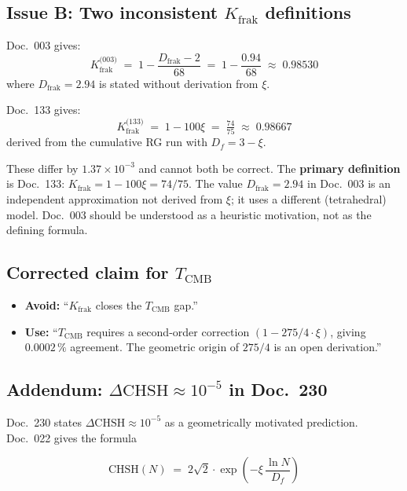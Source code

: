 \subsection*{Issue B: Two inconsistent $K_\text{frak}$ definitions}

Doc.~003 gives:
\begin{equation}
  K_\text{frak}^\text{(003)} \;=\; 1 - \frac{D_\text{frak} - 2}{68}
  \;=\; 1 - \frac{0.94}{68} \;\approx\; 0.98530
  \tag{190.18}
\end{equation}
where $D_\text{frak} = 2.94$ is stated without derivation from $\xi$.

Doc.~133 gives:
\begin{equation}
  K_\text{frak}^\text{(133)} \;=\; 1 - 100\xi \;=\; \tfrac{74}{75}
  \;\approx\; 0.98667
  \tag{190.19}
\end{equation}
derived from the cumulative RG run with $D_f = 3 - \xi$.

These differ by $1.37 \times 10^{-3}$ and cannot both be correct.
The \textbf{primary definition} is Doc.~133: $K_\text{frak} = 1 - 100\xi = 74/75$.
The value $D_\text{frak} = 2.94$ in Doc.~003 is an independent approximation
not derived from $\xi$; it uses a different (tetrahedral) model.
Doc.~003 should be understood as a heuristic motivation, not as the
defining formula.

\subsection*{Corrected claim for $T_\text{CMB}$}

\begin{itemize}
  \item \textbf{Avoid:} \enquote{$K_\text{frak}$ closes the $T_\text{CMB}$ gap.}
  \item \textbf{Use:} \enquote{$T_\text{CMB}$ requires a second-order correction
        $(1 - 275/4\cdot\xi)$, giving $0.0002\,\%$ agreement.
        The geometric origin of $275/4$ is an open derivation.}
\end{itemize}

\subsection*{Addendum: $\Delta\text{CHSH} \approx 10^{-5}$ in Doc.~230}

Doc.~230 states $\Delta\text{CHSH} \approx 10^{-5}$ as a geometrically
motivated prediction. Doc.~022 gives the formula

\begin{equation}
  \text{CHSH}(N) \;=\; 2\sqrt{2}\cdot\exp\!\left(-\xi\,\frac{\ln N}{D_f}\right)
  \tag{190.20}
\end{equation}

